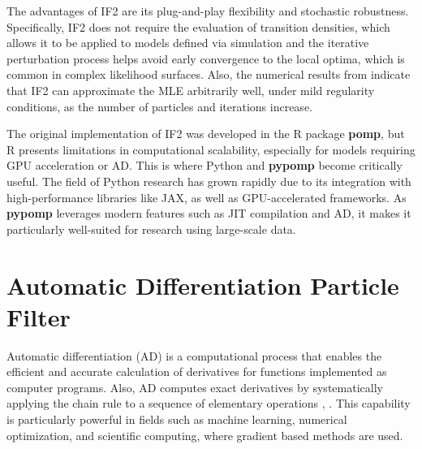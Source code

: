 \documentclass[11pt]{report}
\begin{document}
The advantages of IF2 are its plug-and-play flexibility and stochastic robustness. Specifically, IF2 does not require the evaluation of transition densities, which allows it to be applied to models defined via simulation and the iterative perturbation process helps avoid early convergence to the local optima, which is common in complex likelihood surfaces. Also, the numerical results from \citet{ionides2015inference} indicate that IF2 can approximate the MLE arbitrarily well, under mild regularity conditions, as the number of particles and iterations increase.


The original implementation of IF2 was developed in the R package \textbf{pomp}, but R presents limitations in computational scalability, especially for models requiring GPU acceleration or AD. This is where Python and \textbf{pypomp} become critically useful. The field of Python research has grown rapidly due to its integration with high-performance libraries like JAX, as well as GPU-accelerated frameworks. As \textbf{pypomp} leverages modern features such as JIT compilation and AD, it makes it particularly well-suited for research using large-scale data.




\section{Automatic Differentiation Particle Filter}
Automatic differentiation (AD) is a computational process that enables the efficient and accurate calculation of derivatives for functions implemented as computer programs. Also, AD computes exact derivatives by systematically applying the chain rule to a sequence of elementary operations \citep{rall1996introduction}, \citep{verma2000introduction}. This capability is particularly powerful in fields such as machine learning, numerical optimization, and scientific computing, where gradient based methods are used.
\end{document}
